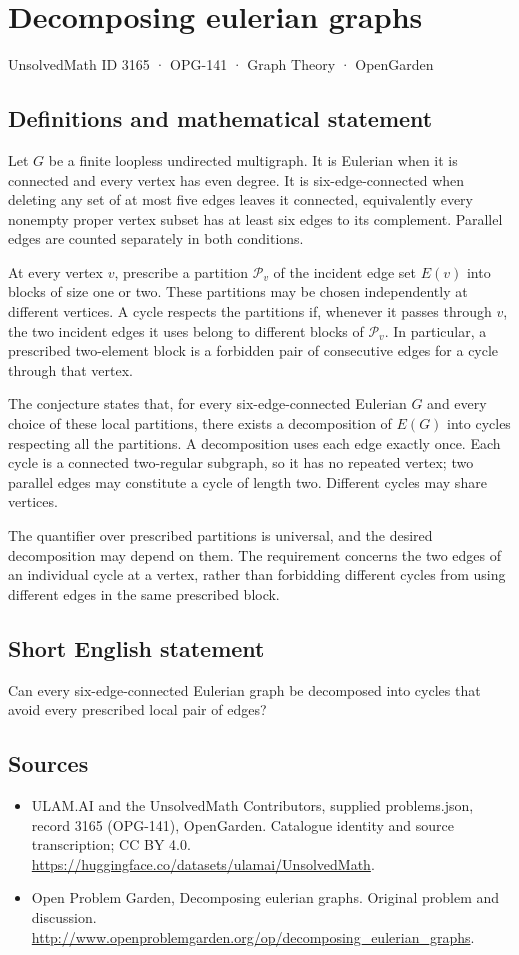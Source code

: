 \documentclass[11pt,a4paper]{article}
\begin{document}
\section*{Decomposing eulerian graphs}\label{3165}
{\small UnsolvedMath ID 3165 · OPG-141 · Graph Theory · OpenGarden}
\subsection{Definitions and mathematical statement}
Let $G$ be a finite loopless undirected multigraph. It is Eulerian when it is connected and every vertex has even degree. It is six-edge-connected when deleting any set of at most five edges leaves it connected, equivalently every nonempty proper vertex subset has at least six edges to its complement. Parallel edges are counted separately in both conditions.

At every vertex $v$, prescribe a partition $\mathcal P_v$ of the incident edge set $E(v)$ into blocks of size one or two. These partitions may be chosen independently at different vertices. A cycle respects the partitions if, whenever it passes through $v$, the two incident edges it uses belong to different blocks of $\mathcal P_v$. In particular, a prescribed two-element block is a forbidden pair of consecutive edges for a cycle through that vertex.

The conjecture states that, for every six-edge-connected Eulerian $G$ and every choice of these local partitions, there exists a decomposition of $E(G)$ into cycles respecting all the partitions. A decomposition uses each edge exactly once. Each cycle is a connected two-regular subgraph, so it has no repeated vertex; two parallel edges may constitute a cycle of length two. Different cycles may share vertices.

The quantifier over prescribed partitions is universal, and the desired decomposition may depend on them. The requirement concerns the two edges of an individual cycle at a vertex, rather than forbidding different cycles from using different edges in the same prescribed block.
\subsection{Short English statement}
Can every six-edge-connected Eulerian graph be decomposed into cycles that avoid every prescribed local pair of edges?
\subsection{Sources}
\begin{itemize}
\item[S1] ULAM.AI and the UnsolvedMath Contributors, supplied problems.json, record 3165 (OPG-141), OpenGarden. Catalogue identity and source transcription; CC BY 4.0.
\url{https://huggingface.co/datasets/ulamai/UnsolvedMath}.
\item[S2] Open Problem Garden, Decomposing eulerian graphs. Original problem and discussion.
\url{http://www.openproblemgarden.org/op/decomposing_eulerian_graphs}.
\end{itemize}
\end{document}
